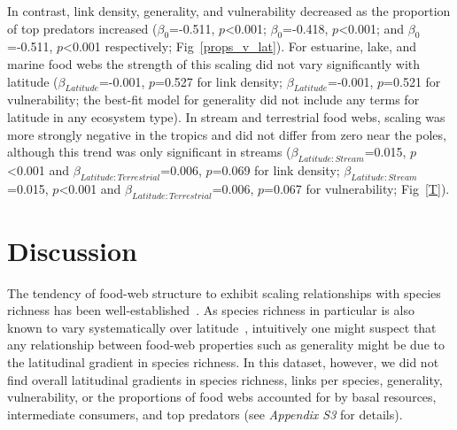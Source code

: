 \documentclass[12pt]{article}
\begin{document}
\begin{spacing}{1.0}
  In contrast, link density, generality, and vulnerability decreased as the
  proportion of top predators increased ($\beta_0$=-0.511, $p$\textless0.001;
  $\beta_0$=-0.418, $p$\textless0.001; and $\beta_0$=-0.511, $p$\textless0.001
  respectively; Fig~\ref{props_v_lat}). For estuarine, lake, and marine
  food webs the strength of this scaling did not
  vary significantly with latitude ($\beta_{Latitude}$=-0.001, $p$=0.527 for
  link density; $\beta_{Latitude}$=-0.001, $p$=0.521 for vulnerability; the
  best-fit model for generality did not include any terms for latitude in
  any ecosystem type). In stream and terrestrial food webs, scaling was more
  strongly negative in the tropics and did not differ from zero near the poles,
  although this trend was only significant in streams
  ($\beta_{Latitude:Stream}$=0.015, $p$\textless0.001 and
  $\beta_{Latitude:Terrestrial}$=0.006, $p$=0.069 for link density;
  $\beta_{Latitude:Stream}$=0.015, $p$\textless0.001 and
  $\beta_{Latitude:Terrestrial}$=0.006, $p$=0.067 for vulnerability; Fig~\ref{T}).



\section*{Discussion}

  The tendency of food-web structure to exhibit scaling relationships with
  species richness has been well-established~\citep{Dunne2004,Riede2010}. As
  species richness in particular is also known to vary systematically over
  latitude~\citep{Schemske2009,Macpherson2002,Kaufman1995}, intuitively one
  might suspect that any relationship between food-web properties such as
  generality might be due to the latitudinal gradient in species richness. In
  this dataset, however, we did not find overall latitudinal gradients in
  species richness, links per species,  generality, vulnerability, or the
  proportions of food webs accounted for by  basal resources, intermediate
  consumers, and top predators (see \emph{Appendix S3} for details).



\end{spacing}
\end{document}
